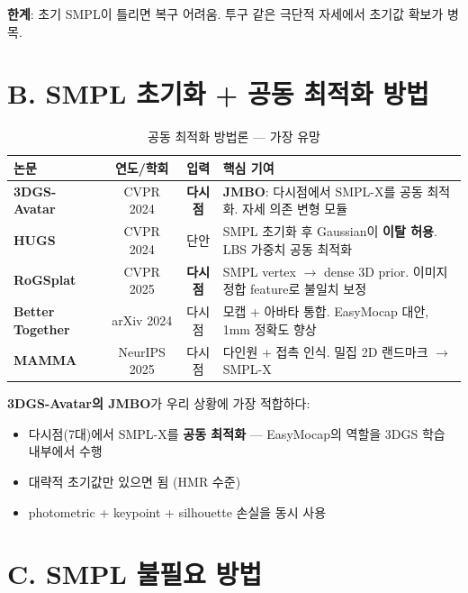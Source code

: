 \documentclass[11pt, a4paper]{report}
\begin{document}
\textbf{한계}: 초기 SMPL이 틀리면 복구 어려움. 투구 같은 극단적 자세에서 초기값 확보가 병목.


\section{B. SMPL 초기화 + 공동 최적화 방법}

\begin{table}[H]
\centering
\caption{공동 최적화 방법론 --- 가장 유망}
\renewcommand{\arraystretch}{1.2}
\scriptsize
\begin{tabularx}{\textwidth}{lccX}
\toprule
\textbf{논문} & \textbf{연도/학회} & \textbf{입력} & \textbf{핵심 기여} \\
\midrule
\textbf{3DGS-Avatar} & CVPR 2024 & \textbf{다시점} & \textbf{JMBO}: 다시점에서 SMPL-X를 공동 최적화. 자세 의존 변형 모듈 \\
\textbf{HUGS} & CVPR 2024 & 단안 & SMPL 초기화 후 Gaussian이 \textbf{이탈 허용}. LBS 가중치 공동 최적화 \\
\textbf{RoGSplat} & CVPR 2025 & \textbf{다시점} & SMPL vertex $\rightarrow$ dense 3D prior. 이미지 정합 feature로 불일치 보정 \\
\textbf{Better Together} & arXiv 2024 & 다시점 & 모캡 + 아바타 통합. EasyMocap 대안, 1mm 정확도 향상 \\
\textbf{MAMMA} & NeurIPS 2025 & 다시점 & 다인원 + 접촉 인식. 밀집 2D 랜드마크 $\rightarrow$ SMPL-X \\
\bottomrule
\end{tabularx}
\end{table}

\begin{keyidea}
\textbf{3DGS-Avatar의 JMBO}가 우리 상황에 가장 적합하다:
\begin{itemize}[nosep]
  \item 다시점(7대)에서 SMPL-X를 \textbf{공동 최적화} --- EasyMocap의 역할을 3DGS 학습 내부에서 수행
  \item 대략적 초기값만 있으면 됨 (HMR 수준)
  \item photometric + keypoint + silhouette 손실을 동시 사용
\end{itemize}
\end{keyidea}


\section{C. SMPL 불필요 방법}
\end{document}
